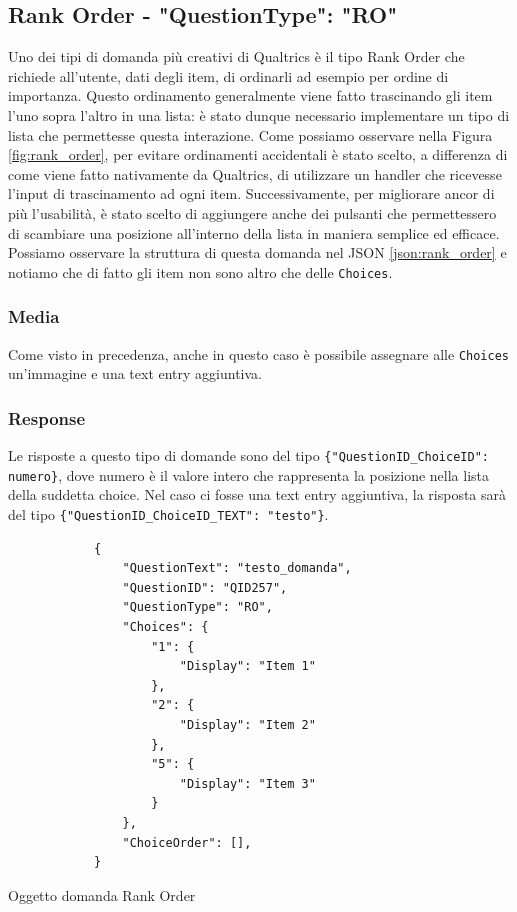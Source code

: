 \subsection{Rank Order - "QuestionType": "RO"}
Uno dei tipi di domanda più creativi di Qualtrics è il tipo Rank Order che richiede all'utente, dati degli item, di ordinarli ad esempio per ordine di importanza. Questo ordinamento generalmente viene fatto trascinando gli item l'uno sopra l'altro in una lista: è stato dunque necessario implementare un tipo di lista che permettesse questa interazione. Come possiamo osservare nella Figura \ref{fig:rank_order}, per evitare ordinamenti accidentali è stato scelto, a differenza di come viene fatto nativamente da Qualtrics, di utilizzare un handler che ricevesse l'input di trascinamento ad ogni item. Successivamente, per migliorare ancor di più l'usabilità, è stato scelto di aggiungere anche dei pulsanti che permettessero di scambiare una posizione all'interno della lista in maniera semplice ed efficace. Possiamo osservare la struttura di questa domanda nel JSON \ref{json:rank_order} e notiamo che di fatto gli item non sono altro che delle \texttt{Choices}.

\subsubsection{Media}
Come visto in precedenza, anche in questo caso è possibile assegnare alle \texttt{Choices} un'immagine e una text entry aggiuntiva.

\subsubsection{Response}
Le risposte a questo tipo di domande sono del tipo \texttt{\{"QuestionID\_ChoiceID": numero\}}, dove numero è il valore intero che rappresenta la posizione nella lista della suddetta choice. Nel caso ci fosse una text entry aggiuntiva, la risposta sarà del tipo \texttt{\{"QuestionID\_ChoiceID\_TEXT": "testo"\}}.

\newpage
\begin{json}
\begin{verbatim}
            {
                "QuestionText": "testo_domanda",
                "QuestionID": "QID257",
                "QuestionType": "RO",
                "Choices": {
                    "1": {
                        "Display": "Item 1"
                    },
                    "2": {
                        "Display": "Item 2"
                    },
                    "5": {
                        "Display": "Item 3"
                    }
                },
                "ChoiceOrder": [],
            }
\end{verbatim}
\caption{Oggetto domanda Rank Order}
\label{json:rank_order}
\end{json}

